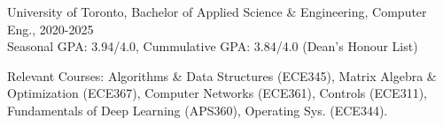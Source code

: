 University of Toronto, Bachelor of Applied Science \& Engineering, Computer Eng., 2020-2025 \\
Seasonal GPA: 3.94/4.0, Cummulative GPA: 3.84/4.0 (Dean’s Honour List) \\
\raggedright{Relevant Courses: Algorithms \& Data Structures (ECE345), Matrix Algebra \& Optimization (ECE367), 
Computer Networks (ECE361), Controls (ECE311), Fundamentals of Deep Learning (APS360), Operating Sys. (ECE344).} \\[10pt]
